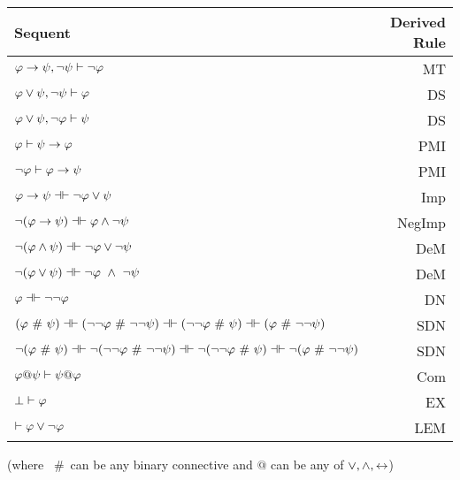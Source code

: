 \begin{center}
\begin{tabular}{l  r}
\textbf{Sequent}                    &       \textbf{Derived Rule} \\ \hline
$\mathcal{\varphi} \rightarrow \mathcal{\psi},  \neg\mathcal{\psi} \vdash \neg \mathcal{\varphi}$   &                       MT  \\
$\mathcal{\varphi} \vee \mathcal{\psi},  \neg\mathcal{\psi} \vdash \mathcal{\varphi}$ & DS\\
$\mathcal{\varphi} \vee \mathcal{\psi},  \neg\mathcal{\varphi}\vdash \mathcal{\psi}$    &      DS  \\
$\mathcal{\varphi} \vdash\mathcal{\psi} \rightarrow \mathcal{\varphi}$  &              PMI  \\
$\neg\mathcal{\varphi}\vdash\mathcal{\varphi}\rightarrow \mathcal{\psi}$  & PMI\\
$\meta{\varphi} \rightarrow\meta{\psi} \pequiv \enot\meta{\varphi}\eor \meta{\psi}$  &                   Imp   \\
$\enot (\meta{\varphi} \rightarrow \meta{\psi}) \pequiv \meta{\varphi} \eand \enot \meta{\psi}$  &               NegImp  \\
$\enot (\meta{\varphi} \eand \meta{\psi})  \pequiv \enot\meta{\varphi}\eor \enot \meta{\psi}$  &                DeM  \\
$\enot (\meta{\varphi} \eor \meta{\psi}) \pequiv \enot\meta{\varphi}\ \eand \ \enot \meta{\psi}$   &               DeM  \\
$\meta{\varphi} \pequiv \enot \enot \meta{\varphi}$     &                              DN  \\
$(\meta{\varphi}  \ \#\  \meta{\psi}) \pequiv (\enot \enot \meta{\varphi}  \ \#\   \enot \enot \meta{\psi}) \pequiv (\enot \enot \meta{\varphi}  \ \#\  \meta{\psi}) \pequiv (\meta{\varphi}  \ \#\  \enot \enot  \meta{\psi})$ & SDN\\
$\enot (\meta{\varphi}  \ \#\  \meta{\psi}) \pequiv \enot (\enot \enot \meta{\varphi}  \ \#\   \enot \enot \meta{\psi}) \pequiv \enot (\enot \enot \meta{\varphi}  \ \#\  \meta{\psi}) \pequiv \enot (\meta{\varphi}  \ \#\  \enot \enot  \meta{\psi})$ & SDN\\
$\mathcal{\varphi} @ \mathcal{\psi}  \vdash  \mathcal{\psi} @ \mathcal{\varphi}$ &                          Com \\
$\bot \vdash \mathcal{\varphi}$ & EX \\
 $\vdash \mathcal{\varphi}\vee \neg \mathcal{\varphi}$ &                                                    LEM \\
\end{tabular}
\vspace{1em}

(where  \ \#\  can be any binary connective and $@$ can be any of  $\vee, \wedge, \leftrightarrow$)
\end{center}


